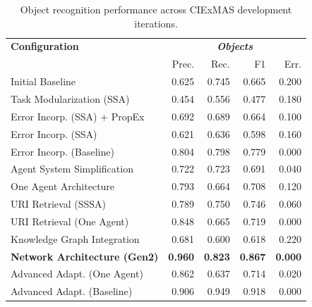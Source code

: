\documentclass[a4paper,oneside,bibliography=totoc]{scrbook}
\begin{document}
\begin{table}[h]
  \centering
  \begin{tabular}{p{6cm}|rrrr}
    \toprule
    \textbf{Configuration}               & \multicolumn{4}{c}{\textit{\textbf{Objects}}}                                                    \\
                                         & Prec.                                         & Rec.           & F1             & Err.           \\
    \midrule
    Initial Baseline                     & 0.625                                         & 0.745          & 0.665          & 0.200          \\
    Task Modularization (SSA)            & 0.454                                         & 0.556          & 0.477          & 0.180          \\
    Error Incorp. (SSA) + PropEx         & 0.692                                         & 0.689          & 0.664          & 0.100          \\
    Error Incorp. (SSA)                  & 0.621                                         & 0.636          & 0.598          & 0.160          \\
    Error Incorp. (Baseline)             & 0.804                                         & 0.798          & 0.779          & 0.000          \\
    Agent System Simplification          & 0.722                                         & 0.723          & 0.691          & 0.040          \\
    One Agent Architecture               & 0.793                                         & 0.664          & 0.708          & 0.120          \\
    URI Retrieval (SSSA)                 & 0.789                                         & 0.750          & 0.746          & 0.060          \\
    URI Retrieval (One Agent)            & 0.848                                         & 0.665          & 0.719          & 0.000          \\
    Knowledge Graph Integration          & 0.681                                         & 0.600          & 0.618          & 0.220          \\
    \textbf{Network Architecture (Gen2)} & \textbf{0.960}                                & \textbf{0.823} & \textbf{0.867} & \textbf{0.000} \\
    Advanced Adapt. (One Agent)          & 0.862                                         & 0.637          & 0.714          & 0.020          \\
    Advanced Adapt. (Baseline)           & 0.906                                         & 0.949          & 0.918          & 0.000          \\
    \bottomrule
  \end{tabular}
  \caption{Object recognition performance across CIExMAS development iterations.}
  \label{tab:evaluation_objects_iterations}
\end{table}
\end{document}
